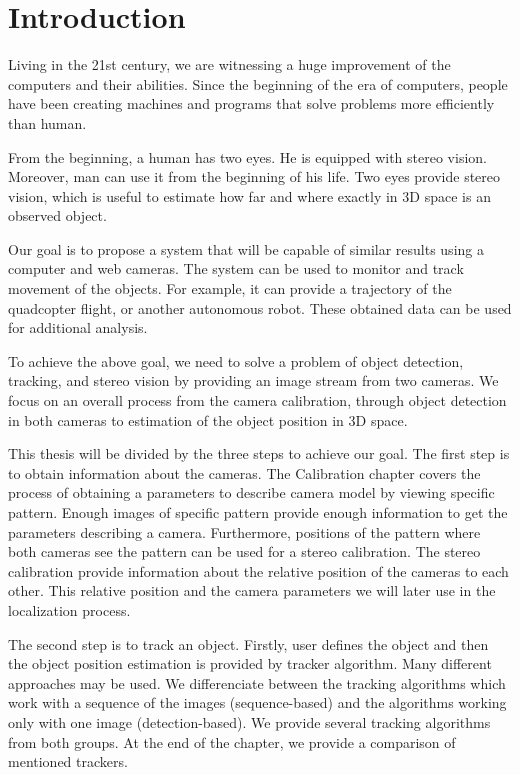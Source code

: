 \chapter*{Introduction}

Living in the 21st century, we are witnessing a huge improvement of the
computers and their abilities. Since the beginning of the era of computers,
people have been creating machines and programs that solve problems more
efficiently than human.

From the beginning, a human has two eyes. He is equipped with stereo vision.
Moreover, man can use it from the beginning of his life. Two eyes provide
stereo vision, which is useful to estimate how far and where exactly in 3D
space is an observed object.

Our goal is to propose a system that will be capable of similar results using a
computer and web cameras. The system can be used to monitor and track movement
of the objects. For example, it can provide a trajectory of the quadcopter
flight, or another autonomous robot. These obtained data can be used for
additional analysis.

To achieve the above goal, we need to solve a problem of object detection,
tracking, and stereo vision by providing an image stream from two cameras. We
focus on an overall process from the camera calibration, through object
detection in both cameras to estimation of the object position in 3D space.

This thesis will be divided by the three steps to achieve our goal. The first
step is to obtain information about the cameras. The Calibration chapter covers the
process of obtaining a parameters to describe camera model by viewing specific
pattern. Enough images of specific pattern provide enough information to get
the parameters describing a camera.  Furthermore, positions of the pattern
where both cameras see the pattern can be used for a stereo calibration. The
stereo calibration provide information about the relative position of the
cameras to each other. This relative position and the camera parameters we will
later use in the localization process.

The second step is to track an object. Firstly, user defines the object and
then the object position estimation is provided by tracker algorithm. Many
different approaches may be used. We differenciate between the tracking
algorithms which work with a sequence of the images (sequence-based) and the
algorithms working only with one image (detection-based). We provide several
tracking algorithms from both groups. At the end of the chapter, we provide a
comparison of mentioned trackers.


